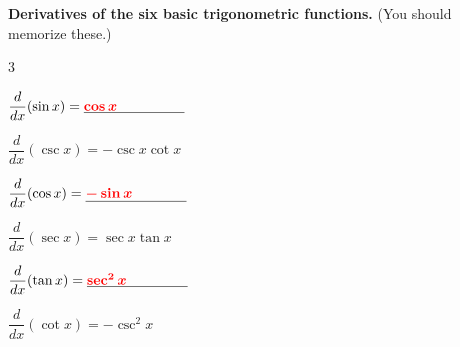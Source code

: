 \documentclass{article}
\begin{document}
 \begin{framed}
    \textbf{Derivatives of the six basic trigonometric functions.}  (You
    should memorize these.)

    \begin{multicols}{3}
    
      $\dfrac{d}{dx} (\sin x) = \fitb{1in}{
      \solonly\textcolor{red}{\cos x}
      }$

      $\dfrac{d}{dx} (\csc x) = - \csc x \cot x$

      $\dfrac{d}{dx} (\cos x) = \fitb{1in}{\solonly\textcolor{red}{-\sin x}}$

      $\dfrac{d}{dx} (\sec x) = \sec x \tan x$

      $\dfrac{d}{dx} (\tan x) = \fitb{1in}{\solonly\textcolor{red}{\sec ^2 x}}$

      $\dfrac{d}{dx} (\cot x) = -\csc^2 x$
      
    \end{multicols}
    
  \end{framed}
\end{document}
